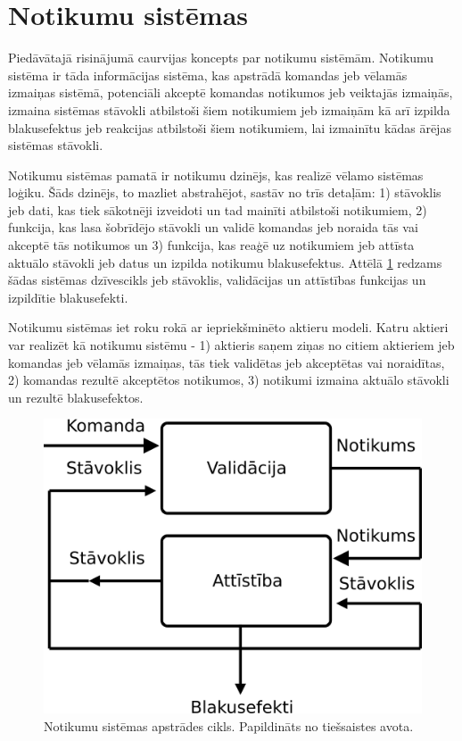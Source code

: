 \section{Notikumu sistēmas}
\label{sec:eventsourcing}

Piedāvātajā risinājumā caurvijas koncepts par notikumu sistēmām. Notikumu
sistēma ir tāda informācijas sistēma, kas apstrādā komandas jeb vēlamās izmaiņas
sistēmā, potenciāli akceptē komandas notikumos jeb veiktajās izmaiņās, izmaina
sistēmas stāvokli atbilstoši šiem notikumiem jeb  izmaiņām kā arī izpilda
blakusefektus jeb reakcijas atbilstoši šiem notikumiem, lai izmainītu kādas
ārējas sistēmas stāvokli.
\cite[para. 3.2.3]{JohnsenEspen2018}

Notikumu sistēmas pamatā ir notikumu dzinējs, kas realizē vēlamo sistēmas
loģiku. Šāds dzinējs, to mazliet abstrahējot, sastāv no trīs detaļām: 1)
stāvoklis jeb dati, kas tiek sākotnēji izveidoti un tad mainīti atbilstoši
notikumiem, 2) funkcija, kas lasa šobrīdējo stāvokli un validē komandas jeb
noraida tās vai akceptē tās notikumos un 3) funkcija, kas reaģē uz notikumiem
jeb attīsta aktuālo stāvokli jeb datus un izpilda notikumu blakusefektus. Attēlā
\ref{fig:eventengine} redzams šādas sistēmas dzīvescikls jeb stāvoklis,
validācijas un attīstības funkcijas un izpildītie blakusefekti.

Notikumu sistēmas iet roku rokā ar iepriekšminēto aktieru modeli. Katru aktieri
var realizēt kā notikumu sistēmu - 1) aktieris saņem ziņas no citiem aktieriem
jeb komandas jeb vēlamās izmaiņas, tās tiek validētas jeb akceptētas vai
noraidītas, 2) komandas rezultē akceptētos notikumos, 3) notikumi izmaina
aktuālo stāvokli un rezultē blakusefektos. 

\begin{figure}[H]
    \includegraphics[width=0.5\linewidth]{assets/event-sourcing-decider.png}
    \centering
    \caption{Notikumu sistēmas apstrādes cikls. Papildināts no tiešsaistes avota. \cite{JeremieChassaing2021}}
    \label{fig:eventengine}
\end{figure}

